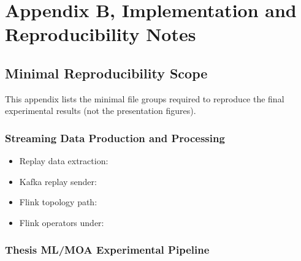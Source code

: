 \chapter{Appendix B, Implementation and Reproducibility Notes}

\section{Minimal Reproducibility Scope}

This appendix lists the minimal file groups required to reproduce the final experimental results (not the presentation figures).

\subsection{Streaming Data Production and Processing}

\begin{itemize}
    \item Replay data extraction: 
    \item Kafka replay sender: 
    \item Flink topology path:
    \item Flink operators under:
\end{itemize}

\subsection{Thesis ML/MOA Experimental Pipeline}

